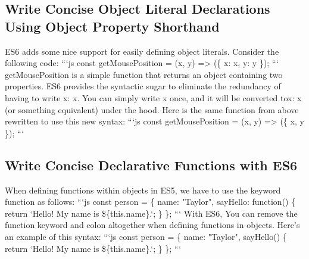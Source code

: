 \documentclass{article}%
\begin{document}
\subsection{Write Concise Object Literal Declarations Using Object Property Shorthand}%
\label{subsec:WriteConciseObjectLiteralDeclarationsUsingObjectPropertyShorthand}%
ES6 adds some nice support for easily defining object literals.\newline%
Consider the following code:\newline%
```js\newline%
const getMousePosition = (x, y) => (\{\newline%
  x: x,\newline%
  y: y\newline%
\});\newline%
```\newline%
getMousePosition is a simple function that returns an object containing two properties.\newline%
ES6 provides the syntactic sugar to eliminate the redundancy of having to write x: x. You can simply write x once, and it will be converted tox: x (or something equivalent) under the hood.\newline%
Here is the same function from above rewritten to use this new syntax:\newline%
```js\newline%
const getMousePosition = (x, y) => (\{ x, y \});\newline%
```\newline%

%
\subsection{Write Concise Declarative Functions with ES6}%
\label{subsec:WriteConciseDeclarativeFunctionswithES6}%
When defining functions within objects in ES5, we have to use the keyword function as follows:\newline%
```js\newline%
const person = \{\newline%
  name: "Taylor",\newline%
  sayHello: function() \{\newline%
    return `Hello! My name is \$\{this.name\}.`;\newline%
  \}\newline%
\};\newline%
```\newline%
With ES6, You can remove the function keyword and colon altogether when defining functions in objects. Here's an example of this syntax:\newline%
```js\newline%
const person = \{\newline%
  name: "Taylor",\newline%
  sayHello() \{\newline%
    return `Hello! My name is \$\{this.name\}.`;\newline%
  \}\newline%
\};\newline%
```\newline%
\end{document}
